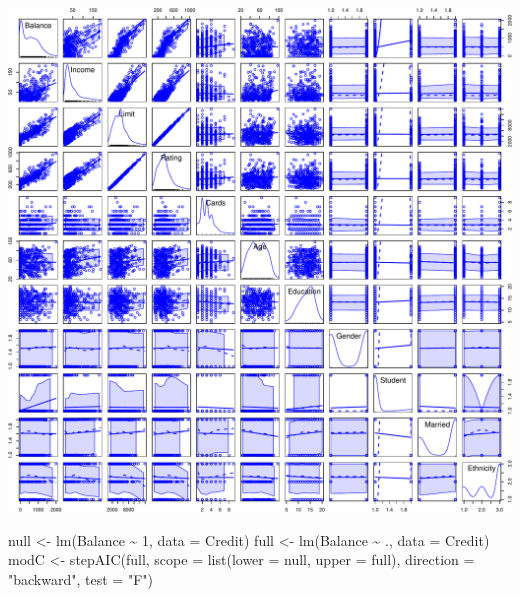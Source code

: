 \documentclass[
]{article}
\newenvironment{Shaded}{\begin{snugshade}}{\end{snugshade}}
\newcommand{\AttributeTok}[1]{\textcolor[rgb]{0.77,0.63,0.00}{#1}}
\newcommand{\DecValTok}[1]{\textcolor[rgb]{0.00,0.00,0.81}{#1}}
\newcommand{\FunctionTok}[1]{\textcolor[rgb]{0.00,0.00,0.00}{#1}}
\newcommand{\NormalTok}[1]{#1}
\newcommand{\OtherTok}[1]{\textcolor[rgb]{0.56,0.35,0.01}{#1}}
\newcommand{\SpecialCharTok}[1]{\textcolor[rgb]{0.00,0.00,0.00}{#1}}
\newcommand{\StringTok}[1]{\textcolor[rgb]{0.31,0.60,0.02}{#1}}
\begin{document}
\begin{center}\includegraphics{SDM-CHAP24_files/figure-latex/SP23-1} \end{center}

\begin{Shaded}
\begin{Highlighting}[]
\NormalTok{null }\OtherTok{\textless{}{-}} \FunctionTok{lm}\NormalTok{(Balance }\SpecialCharTok{\textasciitilde{}} \DecValTok{1}\NormalTok{, }\AttributeTok{data =}\NormalTok{ Credit)}
\NormalTok{full }\OtherTok{\textless{}{-}} \FunctionTok{lm}\NormalTok{(Balance }\SpecialCharTok{\textasciitilde{}}\NormalTok{ ., }\AttributeTok{data =}\NormalTok{ Credit)}
\NormalTok{modC }\OtherTok{\textless{}{-}} \FunctionTok{stepAIC}\NormalTok{(full, }\AttributeTok{scope =} \FunctionTok{list}\NormalTok{(}\AttributeTok{lower =}\NormalTok{ null, }\AttributeTok{upper =}\NormalTok{ full), }\AttributeTok{direction =} \StringTok{"backward"}\NormalTok{, }\AttributeTok{test =} \StringTok{"F"}\NormalTok{)}
\end{Highlighting}
\end{Shaded}
\end{document}
